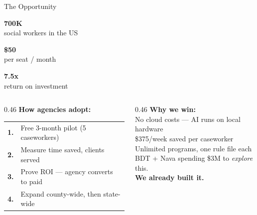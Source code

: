 \documentclass[aspectratio=169,11pt]{beamer}
\newcommand{\chmark}{{\color{accent!80!black}\checkmark}\;}
\begin{document}
\begin{frame}{The Opportunity}
\vspace{8pt}
\begin{center}
  \begin{minipage}{0.30\textwidth}\centering
    {\color{brand}\fontsize{26}{30}\selectfont\bfseries 700K}\\[2pt]
    {\color{muted}\footnotesize social workers in the US}
  \end{minipage}\hfill
  \begin{minipage}{0.30\textwidth}\centering
    {\color{brand}\fontsize{26}{30}\selectfont\bfseries \$50}\\[2pt]
    {\color{muted}\footnotesize per seat / month}
  \end{minipage}\hfill
  \begin{minipage}{0.30\textwidth}\centering
    {\color{brand}\fontsize{26}{30}\selectfont\bfseries 7.5x}\\[2pt]
    {\color{muted}\footnotesize return on investment}
  \end{minipage}
\end{center}
\vspace{14pt}
\begin{columns}[T]
  \begin{column}{0.46\textwidth}
    {\small\textbf{How agencies adopt:}}\\[4pt]
    {\footnotesize
    \begin{tabular}{@{}rl@{}}
      {\color{brand}\textbf{1.}} & Free 3-month pilot (5 caseworkers) \\[2pt]
      {\color{brand}\textbf{2.}} & Measure time saved, clients served \\[2pt]
      {\color{brand}\textbf{3.}} & Prove ROI --- agency converts to paid \\[2pt]
      {\color{brand}\textbf{4.}} & Expand county-wide, then state-wide \\
    \end{tabular}}
  \end{column}
  \begin{column}{0.46\textwidth}
    {\small\textbf{Why we win:}}\\[4pt]
    {\footnotesize
    \chmark No cloud costs --- AI runs on local hardware\\
    \chmark \$375/week saved per caseworker\\
    \chmark Unlimited programs, one rule file each\\
    \chmark BDT + Nava spending \$3M to \textit{explore} this.\\
    \quad\; \textbf{We already built it.}}
  \end{column}
\end{columns}
\end{frame}
\end{document}
